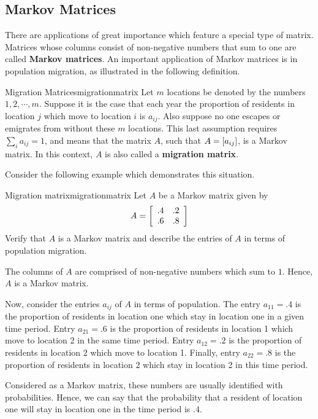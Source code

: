 \subsection{Markov Matrices}

There are applications of great importance which feature a special type of matrix.  Matrices whose columns consist of non-negative numbers that sum to one are
called \textbf{Markov matrices}. An important application of Markov matrices is
in population migration, as illustrated in the following definition. 

\begin{definition}{Migration Matrices}{migrationmatrix}
Let $m$ locations be denoted by the numbers $1,2,\cdots ,m.$ Suppose
it is the case that each year the proportion of residents in location
$j$ which move to location $i$ is $a_{ij}$. Also suppose no one
escapes or emigrates from without these $m$ locations. This last
assumption requires $\sum_{i}a_{ij}=1$, and means that the matrix $A$,
such that $A = \left[ a_{ij} \right]$, is a Markov matrix. In this context,
$A$ is also called a \textbf{migration matrix}.
\end{definition}

Consider the following example which demonstrates this situation.

\begin{example}{Migration matrix}{migrationmatrix}
Let $A$ be a Markov matrix given by 
\begin{equation*}
A = 
\left[
\begin{array}{rr}
.4 & .2 \\
.6 & .8
\end{array}
\right]
\end{equation*}
Verify that $A$ is a Markov matrix and describe the entries of $A$ in terms of population migration.
\end{example}

\begin{solution}
The columns of $A$ are comprised of non-negative numbers which sum to $1$. Hence, $A$ is a Markov matrix. 

Now, consider the entries $a_{ij}$ of $A$ in terms of population. The
entry $a_{11} = .4$ is the proportion of residents in location one
which stay in location one in a given time period.  Entry $a_{21} =
.6$ is the proportion of residents in location 1 which move to
location 2 in the same time period. Entry $a_{12} = .2$ is the
proportion of residents in location 2 which move to location
1. Finally, entry $a_{22} = .8$ is the proportion of residents in
location 2 which stay in location 2 in this time period.  

Considered as a Markov matrix, these numbers are usually identified
with probabilities. Hence, we can say that the probability that a
resident of location one will stay in location one in the time period
is $.4$.
\end{solution}

